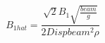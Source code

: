 \begin{equation}
B_{1 hat} = \frac{\sqrt{2} B_{1} \sqrt{\frac{beam}{g}}}{2 Disp beam^{2} \rho}
\end{equation}
